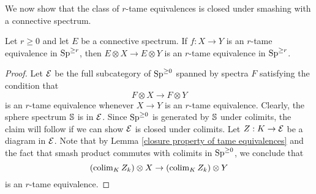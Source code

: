 We now show that the class of $r$-tame equivalences is closed under smashing with a connective spectrum. 
\begin{lemma}
\label{Shift of tame equivalences}
Let $r\geq 0$ and
let $E$ be a connective spectrum. If $f:X\to Y$ is an $r$-tame equivalence in $\operatorname{Sp}^{\geq r}$, then $E\otimes X \to E\otimes Y$ is an $r$-tame equivalence in $\operatorname{Sp}^{\geq r}$.
\end{lemma}
\begin{proof}
Let ${\mathcal{E}}$ be the full subcategory of $\operatorname{Sp}^{\geq 0}$ spanned by spectra $F$ satisfying the condition that
$$
F\otimes X \to F\otimes Y
$$
is an $r$-tame equivalence whenever $X\to Y$ is an $r$-tame equivalence. Clearly, the sphere spectrum ${\mathbb{S}}$ is in ${\mathcal{E}}$. 
Since $\operatorname{Sp}^{\geq 0}$ is generated by ${\mathbb{S}}$ under colimits, the claim will follow if we can show ${\mathcal{E}}$ is closed under colimits. Let $Z:K\to {\mathcal{E}}$ be a diagram in ${\mathcal{E}}$.
Note that by Lemma \ref{closure property of tame equivalences} and the fact that smash product commutes with colimits in $\operatorname{Sp}^{\geq 0}$, we conclude that
$$
(\operatorname{colim}_K Z_k )\otimes X \to (\operatorname{colim}_K Z_k )\otimes Y
$$
is an $r$-tame equivalence.

\end{proof}


